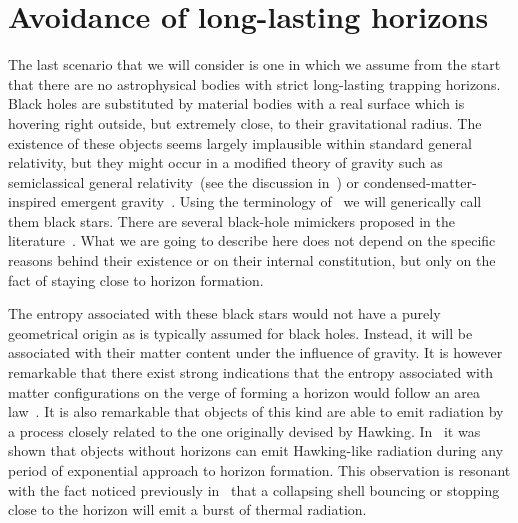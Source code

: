 \documentclass[11pt,a4paper]{article}
\begin{document}
 
 
\section{Avoidance of long-lasting horizons}
\label{Sec:No-horizons}

The last scenario that we will consider is one in which  we assume from the start that
there are no astrophysical bodies with strict long-lasting trapping horizons.
Black holes are substituted by  material bodies with a real surface which is
hovering right outside, but extremely close, to their gravitational radius. The
existence of these objects seems largely implausible within standard general
relativity, but they might occur in a modified theory of gravity such as
semiclassical general relativity~(see the discussion in~\cite{barcelo-fate}) or condensed-matter-inspired emergent gravity~\cite{Barcelo:2010vc}. 
Using the terminology of~\cite{barcelo-fate} we will generically call them black stars.
There are several black-hole mimickers proposed in the literature~\cite{barcelo-fate,mimickers1,mimickers2}. What we are going to describe here does not depend on the specific reasons behind their existence or on their internal constitution, but only on the fact of staying close to horizon formation.


The entropy associated with these black stars would not have a purely
geometrical origin as is typically assumed for black holes. Instead, it will be
associated with their matter content under the influence of gravity. It is
however remarkable that there exist strong indications that the entropy
associated with matter configurations on the verge of forming a horizon would 
follow  an area law~\cite{sorkin,Pretorius:1997wr,abreu,abreu-barcelo,lemos}. It is also remarkable that
objects of this kind are able to emit radiation by a process closely related to
the one originally devised by Hawking. In~\cite{barcelo-rad-no-hor} it was shown
that objects without horizons can emit Hawking-like radiation during any period
of exponential approach to horizon formation. This observation is resonant with
the fact noticed previously  in~\cite{thooft} that a collapsing shell bouncing
or stopping close to the horizon  will emit a burst of thermal radiation.  
\end{document}
